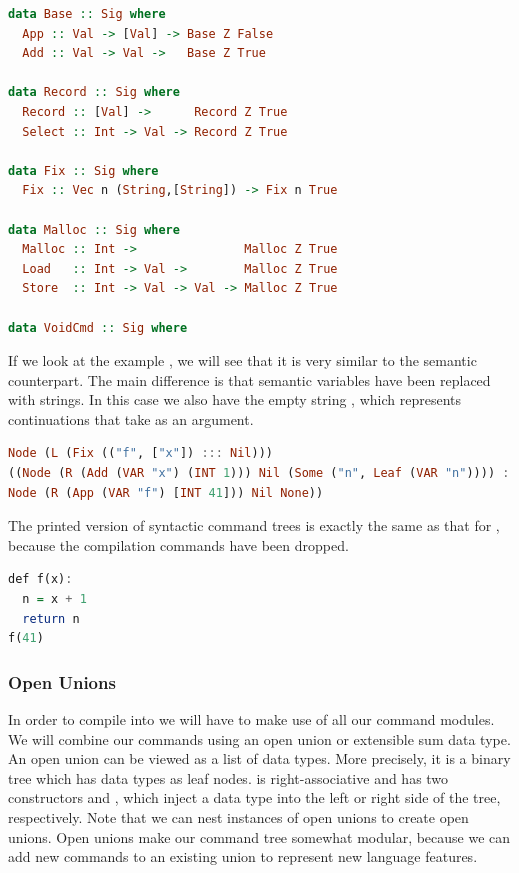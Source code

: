 \begin{lstlisting}[language=Haskell]
data Base :: Sig where
  App :: Val -> [Val] -> Base Z False
  Add :: Val -> Val ->   Base Z True 

data Record :: Sig where
  Record :: [Val] ->      Record Z True
  Select :: Int -> Val -> Record Z True

data Fix :: Sig where
  Fix :: Vec n (String,[String]) -> Fix n True

data Malloc :: Sig where
  Malloc :: Int ->               Malloc Z True
  Load   :: Int -> Val ->        Malloc Z True
  Store  :: Int -> Val -> Val -> Malloc Z True

data VoidCmd :: Sig where
\end{lstlisting}

If we look at the example , we will see that it is very similar to the semantic counterpart. The main difference is that semantic variables have been replaced with strings. In this case we also have the empty string , which represents continuations that take \icode{()} as an argument.

\begin{lstlisting}[language=Haskell]
Node (L (Fix (("f", ["x"]) ::: Nil)))
((Node (R (Add (VAR "x") (INT 1))) Nil (Some ("n", Leaf (VAR "n")))) ::: Nil) (Some ("",
Node (R (App (VAR "f") [INT 41])) Nil None))
\end{lstlisting}

The printed version of syntactic command trees is exactly the same as that for , because the compilation commands have been dropped.

\begin{lstlisting}[language=Haskell]
def f(x):
  n = x + 1
  return n
f(41)
\end{lstlisting}

\subsubsection{\label{subsection:openunion}Open Unions}
In order to compile  into  we will have to make use of all our  command modules. We will combine our commands using an open union or extensible sum data type. An open union can be viewed as a list of data types. More precisely, it is a binary tree which has data types as leaf nodes. \icode{:+:} is right-associative and has two constructors  and , which inject a data type into the left or right side of the tree, respectively. Note that we can nest instances of open unions to create open unions. Open unions make our command tree somewhat modular, because we can add new commands to an existing union to represent new language features.

